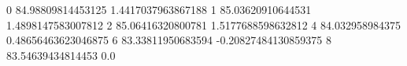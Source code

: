 0 84.98809814453125 1.4417037963867188
1 85.03620910644531 1.4898147583007812
2 85.06416320800781 1.5177688598632812
4 84.032958984375 0.48656463623046875
6 83.33811950683594 -0.20827484130859375
8 83.54639434814453 0.0
